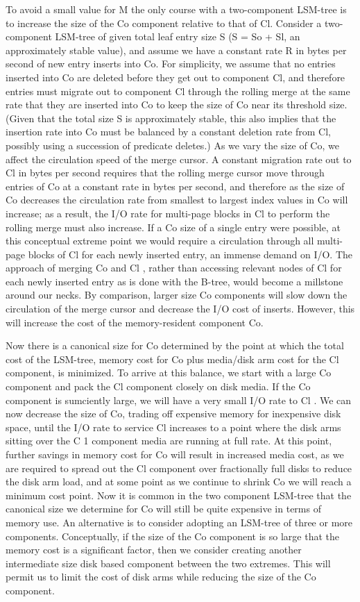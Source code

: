 \documentclass[a4paper,11pt,notitlepage,twoside,openright]{article}
\begin{document}
To avoid a small value for M the only course with a two-component
LSM-tree is to increase the size of the Co component relative to that of
Cl. Consider a two-component LSM-tree of given total leaf entry size S
(S = So + Sl, an approximately stable value), and assume we have a
constant rate R in bytes per second of new entry inserts into Co. For
simplicity, we assume that no entries inserted into Co are deleted
before they get out to component Cl, and therefore entries must migrate
out to component Cl through the rolling merge at the same rate that they
are inserted into Co to keep the size of Co near its threshold size.
(Given that the total size S is approximately stable, this also implies
that the insertion rate into Co must be balanced by a constant deletion
rate from Cl, possibly using a succession of predicate deletes.) As we
vary the size of Co, we affect the circulation speed of the merge
cursor. A constant migration rate out to Cl in bytes per second requires
that the rolling merge cursor move through entries of Co at a constant
rate in bytes per second, and therefore as the size of Co decreases the
circulation rate from smallest to largest index values in Co will
increase; as a result, the I/O rate for multi-page blocks in Cl to
perform the rolling merge must also increase. If a Co size of a single
entry were possible, at this conceptual extreme point we would require a
circulation through all multi-page blocks of Cl for each newly inserted
entry, an immense demand on I/O. The approach of merging Co and Cl ,
rather than accessing relevant nodes of Cl for each newly inserted entry
as is done with the B-tree, would become a millstone around our necks.
By comparison, larger size Co components will slow down the circulation
of the merge cursor and decrease the I/O cost of inserts. However, this
will increase the cost of the memory-resident component Co.


Now there is a canonical size for Co determined by the point at which
the total cost of the LSM-tree, memory cost for Co plus media/disk arm
cost for the Cl component, is minimized. To arrive at this balance, we
start with a large Co component and pack the Cl component closely on
disk media. If the Co component is sumciently large, we will have a very
small I/O rate to Cl . We can now decrease the size of Co, trading off
expensive memory for inexpensive disk space, until the I/O rate to
service Cl increases to a point where the disk arms sitting over the C 1
component media are running at full rate. At this point, further savings
in memory cost for Co will result in increased media cost, as we are
required to spread out the Cl component over fractionally full disks to
reduce the disk arm load, and at some point as we continue to shrink Co
we will reach a minimum cost point. Now it is common in the two
component LSM-tree that the canonical size we determine for Co will
still be quite expensive in terms of memory use. An alternative is to
consider adopting an LSM-tree of three or more components. Conceptually,
if the size of the Co component is so large that the memory cost is a
significant factor, then we consider creating another intermediate size
disk based component between the two extremes. This will permit us to
limit the cost of disk arms while reducing the size of the Co component.
\end{document}
